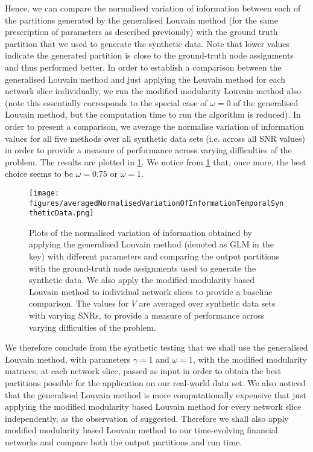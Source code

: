 Hence, we can compare the normalised variation of information between each of the partitions generated by the generalised Louvain method (for the same prescription of parameters as described previously) with the ground truth partition that we used to generate the synthetic data.
Note that lower values indicate the generated partition is close to the ground-truth node assignments and thus performed better.
In order to establish a comparison between the generalised Louvain method and just applying the Louvain method for each network slice individually, we run the modified modularity Louvain method also (note this essentially corresponds to the special case of $\omega = 0$ of the generalised Louvain method, but the computation time to run the algorithm is reduced).
In order to present a comparison, we average the normalise variation of information values for all five methods over all synthetic data sets (i.e. across all SNR values) in order to provide a measure of performance across varying difficulties of the problem.
The results are plotted in \cref{fig:averagedNormalisedVariationOfInformation}.
We notice from \cref{fig:averagedNormalisedVariationOfInformation} that, once more, the best choice seems to be $\omega = 0.75$ or $\omega = 1$.

\begin{figure}
	\centering
	\texttt{[image: figures/averagedNormalisedVariationOfInformationTemporalSyntheticData.png]}
	\caption[Plots of the normalised variation of information obtained by applying the generalised Louvain method with different parameters.]{\label{fig:averagedNormalisedVariationOfInformation} Plots of the normalised variation of information obtained by applying the generalised Louvain method (denoted as GLM in the key) with different parameters and comparing the output partitions with the ground-truth node assignments used to generate the synthetic data. We also apply the modified modularity based Louvain method to individual network slices to provide a baseline comparison. The values for $V$ are averaged over synthetic data sets with varying SNRs, to provide a measure of performance across varying difficulties of the problem.}
\end{figure}

We therefore conclude from the synthetic testing that we shall use the generalised Louvain method, with parameters $\gamma=1$ and $\omega=1$, with the modified modularity matrices, at each network slice, passed as input in order to obtain the best partitions possible for the application on our real-world data set.
We also noticed that the generalised Louvain method is more computationally expensive that just applying the modified modularity based Louvain method for every network slice independently, as the observation of \cite{HGH+12} suggested.
Therefore we shall also apply modified modularity based Louvain method to our time-evolving financial networks and compare both the output partitions and run time.

